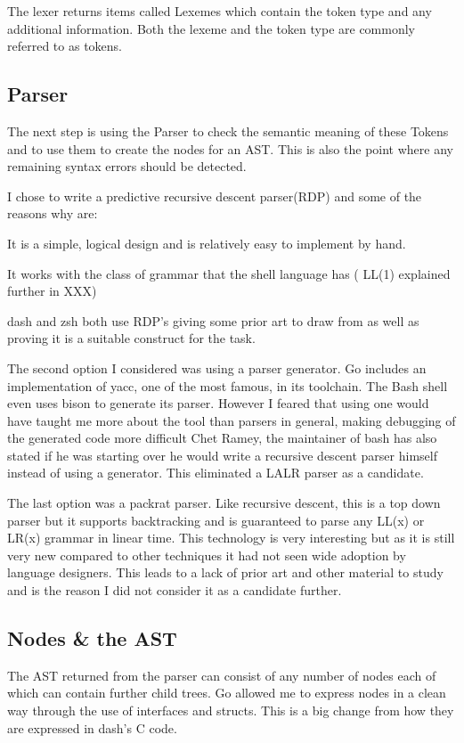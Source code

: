 The lexer returns items called Lexemes which contain the token type and any additional information.
Both the lexeme and the token type are commonly referred to as tokens.

\subsection{Parser}
The next step is using the Parser to check the semantic meaning of these Tokens and to use them to create the nodes for an AST.
This is also the point where any remaining syntax errors should be detected.

I chose to write a predictive recursive descent parser(RDP) and some of the reasons why are:
\begin{enumerate*}
	\item It is a simple, logical design and is relatively easy to implement by hand.
    \item It works with the class of grammar that the shell language has (
    LL(1) explained further in XXX)
    \item dash and zsh both use RDP's giving some prior art to draw from as well as proving it is a suitable construct for the task.
\end{enumerate*}

The second option I considered was using a parser generator.
Go includes an implementation of yacc, one of the most famous, in its toolchain.
The Bash shell even uses bison to generate its parser.
However I feared that using one would have taught me more about the tool than parsers in general, making debugging of the generated code more difficult 
Chet Ramey, the maintainer of bash has also stated if he was starting over he would write a recursive descent parser himself\cite{BASH-ARCH} instead of using a generator.
This eliminated a LALR parser as a candidate.

The last option was a packrat parser.
Like recursive descent, this is a top down parser but it supports backtracking and is guaranteed to parse any LL(x) or LR(x) grammar in linear time.
This technology is very interesting but as it is still very new compared to other techniques it had not seen wide adoption by language designers.
This leads to a lack of prior art and other material to study and is the reason I did not consider it as a candidate further.

\subsection{Nodes \& the AST}
The AST returned from the parser can consist of any number of nodes each of which can contain further child trees.
Go allowed me to express nodes in a clean way through the use of interfaces and structs.
This is a big change from how they are expressed in dash's C code.

